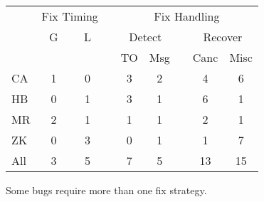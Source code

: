 

\begin{table}[t]
\small
\centering
\begin{tabular}{lcccccccc}
\toprule
   & \multicolumn{2}{c}{Fix Timing} && \multicolumn{5}{c}{Fix Handling}\\
\cmidrule{2-3}
\cmidrule{5-9}
   &  G & L &&
   \multicolumn{2}{c}{Detect} &&
   \multicolumn{2}{c}{Recover}\\
\cmidrule{5-6}
\cmidrule{8-9}
   &&&&
   TO & Msg & &
   Canc & Misc \\
\midrule
CA & 1   & 0 && 3 & 2 && 4 & 6   \\
HB & 0   & 1 && 3 & 1 && 6 & 1   \\
MR & 2   & 1 && 1 & 1 && 2 & 1   \\
ZK & 0   & 3 && 0 & 1 && 1 & 7   \\
\midrule
All& 3   & 5 && 7 & 5 && 13& 15  \\
\bottomrule
\end{tabular}
{Some bugs require more than one fix strategy.}
\end{table}
